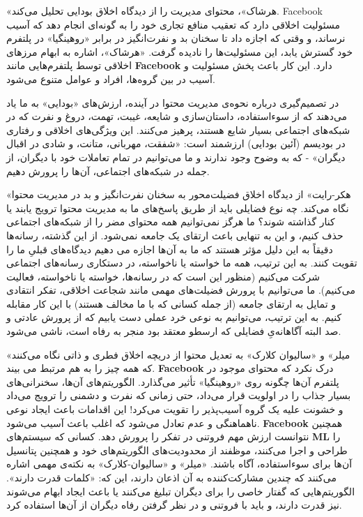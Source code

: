 «هرشاک»، محتوای مدیریت را از دیدگاه اخلاق بودایی تحلیل می‌کند.
Facebook مسئولیت اخلاقی دارد که تعقیب منافع تجاری خود را به گونه‌ای انجام دهد که آسیب نرساند، و وقتی که اجازه داد تا سخنان بد و نفرت‌انگیز در برابر «روهینگیا» در پلتفرم خود گسترش یابد، این مسئولیت‌ها را نادیده گرفت.
«هرشاک»، اشاره به ابهام مرزهای اخلاقی توسط پلتفرم‌هایی مانند \textenglish{\textbf{Facebook}} دارد.
این کار باعث پخش مسئولیت و آسیب در بین گروه‌ها، افراد و عوامل متنوع می‌شود.

در تصمیم‌گیری درباره نحوه‌ی مدیریت محتوا در آینده، ارزش‌های «بودایی» به ما یاد می‌دهند که از سوءاستفاده، داستان‌سازی و شایعه، غیبت، تهمت، دروغ و نفرت که در شبکه‌های اجتماعی بسیار شایع هستند، پرهیز می‌کنند.
این ویژگی‌های اخلاقی و رفتاری در بودیسم (آئین بودایی) ارزشمند است: «شفقت، مهربانی، متانت، و شادی در اقبال دیگران» - که به وضوح وجود ندارند و ما می‌توانیم در تمام تعاملات خود با دیگران، از جمله در شبکه‌های اجتماعی، آن‌ها را پرورش دهیم.

«هکر-رایت» از دیدگاه اخلاق فضیلت‌محور به سخنان نفرت‌انگیز و بد در مدیریت محتوا نگاه می‌کند.
چه نوع فضایلی باید از طریق پاسخ‌های ما به مدیریت محتوا ترویج یابند یا کنار گذاشته شوند؟ ما هرگز نمی‌توانیم همه محتوای مضر را از شبکه‌های اجتماعی حذف کنیم، و این به تنهایی باعث ارتقای یک جامعه نمی‌شود.
از این گذشته، رسانه‌ها دقیقاً به این دلیل مؤثر هستند که ما به آن‌ها اجازه می دهیم دیدگاه‌های قبلیِ ما را تقویت کنند.
به این ترتیب، همه ما خواسته یا ناخواسته، در دستکاری رسانه‌های اجتماعی شرکت می‌کنیم (منظور این است که در رسانه‌ها، خواسته یا ناخواسته، فعالیت می‌کنیم).
ما می‌توانیم با پرورش فضیلت‌های مهمی مانند شجاعت اخلاقی، تفکر انتقادی و تمایل به ارتقای جامعه (از جمله کسانی که با ما مخالف هستند) با این کار مقابله کنیم.
به این ترتیب، می‌توانیم به نوعی خرد عملی دست یابیم که از پرورش عادتی و صد البته آگاهانه‌یِ فضایلی که ارسطو معتقد بود منجر به رفاه است، ناشی می‌شود.

«میلر» و «سالیوان کلارک» به تعدیل محتوا از دریچه اخلاق فطری و ذاتی نگاه می‌کنند که همه چیز را به هم مرتبط می بیند.
\textenglish{\textbf{Facebook}} درک نکرد که محتوای موجود در پلتفرم آن‌ها چگونه روی «روهینگیا» تأثیر می‌گذارد.
الگوریتم‌های آن‌ها، سخنرانی‌های بسیار جذاب را در اولویت قرار می‌داد، حتی زمانی که نفرت و دشمنی را ترویج می‌داد و خشونت علیه یک گروه آسیب‌پذیر را تقویت می‌کرد!
این اقدامات باعث ایجاد نوعی ناهماهنگی و عدم تعادل می‌شود که اغلب باعث آسیب می‌شود.
\textenglish{\textbf{Facebook}} همچنین نتوانست ارزش مهم فروتنی در تفکر را پرورش دهد.
کسانی که سیستم‌های \textenglish{\textbf{ML}} را طراحی و اجرا می‌کنند، موظفند از محدودیت‌های الگوریتم‌های خود و همچنین پتانسیل آن‌ها برای سوءاستفاده، آگاه باشند.
«میلر» و «سالیوان-کلارک» به نکته‌ی مهمی اشاره می‌کنند که چندین مشارکت‌کننده به آن اذعان دارند، این که: «کلمات قدرت دارند».
الگوریتم‌هایی که گفتار خاصی را برای دیگران تبلیغ می‌کنند یا باعث ایجاد ابهام می‌شوند نیز قدرت دارند، و باید با فروتنی و در نظر گرفتن رفاه دیگران از آن‌ها استفاده کرد.


